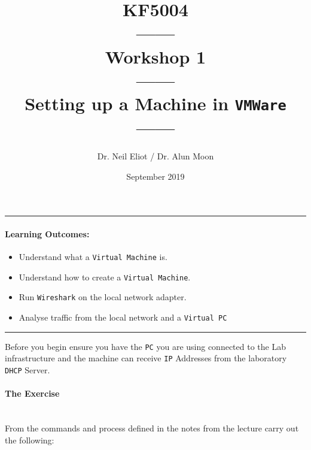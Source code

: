 \documentclass[11pt]{article}
\begin{document}
\author{Dr. Neil Eliot / Dr. Alun Moon}
\title{KF5004\\------\\Workshop 1\\------\\Setting up a Machine in \texttt{VMWare}\\------}
\date{September 2019}
\maketitle

\medskip

\begin{center}
    \noindent\rule{8cm}{0.4pt}
\end{center}


\paragraph{Learning Outcomes:}
\begin{itemize}
\item Understand what a \texttt{Virtual Machine} is.
\item Understand how to create a \texttt{Virtual Machine}.
\item Run \texttt{Wireshark} on the local network adapter.
\item Analyse traffic from the local network and a \texttt{Virtual PC}
\end{itemize}

\begin{center}
\noindent\rule{8cm}{0.4pt}
\end{center}

\begin{tcolorbox}[title={\textbf{Note:}}]
    Before you begin ensure you have the \texttt{PC} you are using connected to the Lab infrastructure and the machine can receive \texttt{IP} Addresses from the laboratory \texttt{DHCP} Server.
\end{tcolorbox}

\paragraph{The Exercise}\mbox{}\\

\noindent From the commands and process defined in the notes from the lecture carry out the following:
\end{document}
